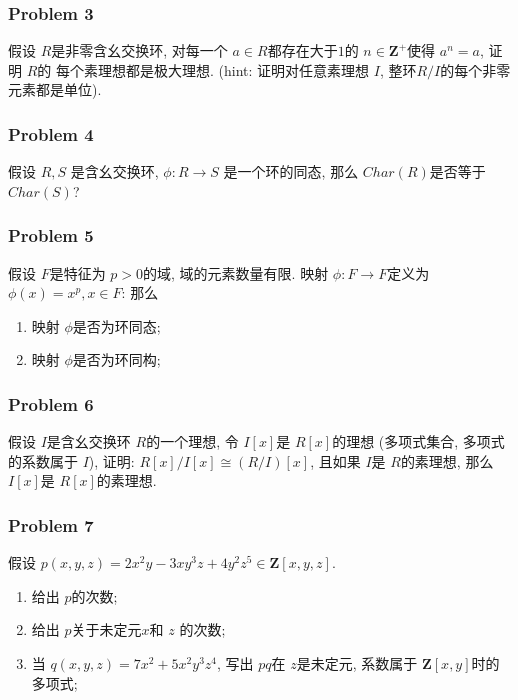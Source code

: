 \documentclass[a4paper,12pt]{ctexart}
\newcommand{\Z}{\mathbf{Z}}
\begin{document}
\subsubsection*{Problem 3}
    假设 $ R $是非零含幺交换环, 对每一个 $ a\in R $都存在大于$1$的 $ n\in\Z^+ $使得 $ a^n=a $, 证明 $ R $的
    每个素理想都是极大理想. (hint: 证明对任意素理想 $ I $, 整环$ R/I $的每个非零元素都是单位). 
\subsubsection*{Problem 4}
    假设 $ R,S $ 是含幺交换环, $ \phi:R\rightarrow S $ 是一个环的同态, 那么 $ Char(R) $是否等于 $ Char(S) $? 
    \subsubsection*{Problem 5}
    假设 $ F $是特征为 $ p>0 $的域, 域的元素数量有限. 映射 $ \phi:F\rightarrow F $定义为 $ \phi(x)=x^p,x\in F $:
    那么\begin{enumerate}
      \item 映射 $ \phi $是否为环同态;
      \item 映射 $ \phi $是否为环同构;
    \end{enumerate} 
\subsubsection*{Problem 6}
    假设 $ I $是含幺交换环 $ R $的一个理想, 令 $ I[x] $是 $ R[x] $的理想 (多项式集合, 多项式的系数属于 $ I $), 证明: $ R[x]/I[x]\cong (R/I)[x] $, 且如果
    $ I $是 $ R $的素理想, 那么 $ I[x] $是 $ R[x] $的素理想. 
\subsubsection*{Problem 7}
    假设 $ p(x,y,z)=2x^2y-3xy^3z+4y^2z^5\in\Z[x,y,z] $.
    \begin{enumerate}
      \item 给出 $ p $的次数;
      \item 给出 $ p $关于未定元$ x $和 $ z $ 的次数;
      \item 当 $ q(x,y,z)=7x^2+5x^2y^3z^4 $, 写出 $ pq $在 $ z $是未定元, 系数属于 $ \Z[x,y] $时的多项式;
    \end{enumerate}
\end{document}
